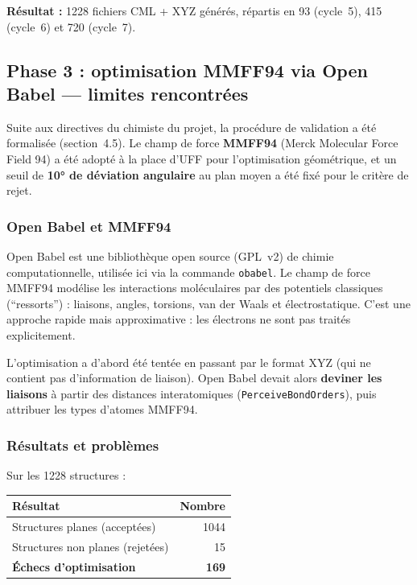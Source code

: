 \documentclass[a4paper,12pt]{article}
\begin{document}
\textbf{Résultat :} 1228 fichiers CML + XYZ générés, répartis en 93 (cycle~5), 415 (cycle~6)
et 720 (cycle~7).

\subsection{Phase 3 : optimisation MMFF94 via Open Babel — limites rencontrées}

Suite aux directives du chimiste du projet, la procédure de validation a été formalisée
(section~4.5). Le champ de force \textbf{MMFF94} (Merck Molecular Force Field 94) a été adopté
à la place d'UFF pour l'optimisation géométrique, et un seuil de \textbf{10° de déviation
angulaire} au plan moyen a été fixé pour le critère de rejet.

\subsubsection{Open Babel et MMFF94}

Open Babel est une bibliothèque open source (GPL~v2) de chimie computationnelle, utilisée ici
via la commande \texttt{obabel}. Le champ de force MMFF94 modélise les interactions moléculaires
par des potentiels classiques (``ressorts'') : liaisons, angles, torsions, van der Waals et
électrostatique. C'est une approche rapide mais approximative : les électrons ne sont pas
traités explicitement.

L'optimisation a d'abord été tentée en passant par le format XYZ (qui ne contient pas
d'information de liaison). Open Babel devait alors \textbf{deviner les liaisons} à partir des
distances interatomiques (\texttt{PerceiveBondOrders}), puis attribuer les types d'atomes MMFF94.

\subsubsection{Résultats et problèmes}

Sur les 1228 structures :

\begin{center}
\begin{tabular}{lr}
  \toprule
  Résultat & Nombre \\
  \midrule
  Structures planes (acceptées) & 1044 \\
  Structures non planes (rejetées) & 15 \\
  \textbf{Échecs d'optimisation} & \textbf{169} \\
  \bottomrule
\end{tabular}
\end{center}
\end{document}
